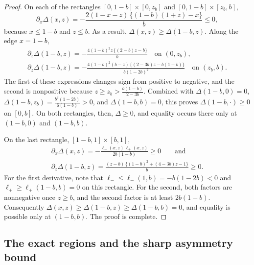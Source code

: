 \documentclass[11pt,a4paper]{article}
\theoremstyle{remark}
\newcommand{\1}{\mathbf{1}}
\begin{document}
\begin{proof}
On each of the rectangles $[0,1-b]\times[0,z_b]$ and $[0,1-b]\times[z_b,b]$,
\[
  \partial_x\Delta(x,z)=-\frac{2(1-x-z)\,\bigl\{(1-b)(1+z)-x\bigr\}}{b}\le0,
\]
because $x\le1-b$ and $z\le b$.
As a result, $\Delta(x,z)\ge\Delta(1-b,z)$.
Along the edge $x=1-b$,
\begin{gather*}
  \partial_z\Delta(1-b,z)=-\frac{4(1-b)^2z\,\bigl\{(2-b)z-b\bigr\}}{b}
  \quad\text{on }(0,z_b),\\
  \partial_z\Delta(1-b,z)=-\frac{4(1-b)^2(b-z)\,\bigl\{(2-3b)z-b(1-b)\bigr\}}{b(1-2b)^2}
  \quad\text{on }(z_b,b).
\end{gather*}
The first of these expressions changes sign from positive to negative, and the second is nonpositive because $z\ge z_b>\frac{b(1-b)}{2-3b}$.
Combined with $\Delta(1-b,0)=0$, $\Delta(1-b,z_b)=\frac{b^2(1-2b)}{6(1-b)}>0$, and $\Delta(1-b,b)=0$, this proves $\Delta(1-b,\cdot)\ge0$ on $[0,b]$.
On both rectangles, then, $\Delta\ge0$, and equality occurs there only at $(1-b,0)$ and $(1-b,b)$.

On the last rectangle, $[1-b,1]\times[b,1]$,
\begin{gather*}
  \partial_x\Delta(x,z)=-\frac{\ell_-(x,z)\,\ell_+(x,z)}{2b(1-b)}\ge0
  \qquad\text{and}\\
  \partial_z\Delta(1-b,z)=\frac{(z-b)\,\bigl\{(1-b)^2+(4-3b)z-1\bigr\}}{b}\ge0.
\end{gather*}
For the first derivative, note that $\ell_-\le\ell_-(1,b)=-b(1-2b)<0$ and $\ell_+\ge\ell_+(1-b,b)=0$ on this rectangle.
For the second, both factors are nonnegative once $z\ge b$, and the second factor is at least $2b(1-b)$.
Consequently $\Delta(x,z)\ge\Delta(1-b,z)\ge\Delta(1-b,b)=0$, and equality is possible only at $(1-b,b)$.
The proof is complete.
\end{proof}

\subsection{The exact regions and the sharp asymmetry bound}
\label{sec:eta-proof}
\end{document}
